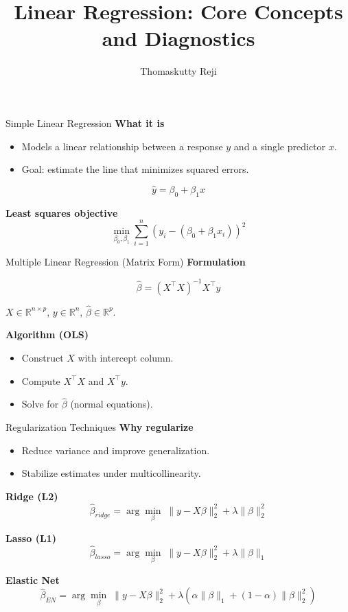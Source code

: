 \documentclass[aspectratio=169,10pt]{beamer}
\title{Linear Regression: Core Concepts and Diagnostics}
\author{Thomaskutty Reji}
\date{}
\begin{document}
\begin{frame}[t]{Simple Linear Regression}
\textbf{What it is}
\begin{itemize}
\item Models a linear relationship between a response $y$ and a single predictor $x$.
\item Goal: estimate the line that minimizes squared errors.
\end{itemize}

\begin{keyeq}
\[
\hat{y} = \beta_0 + \beta_1 x
\]
\end{keyeq}

\textbf{Least squares objective}
\[
\min_{\beta_0,\beta_1} \sum_{i=1}^{n} (y_i - (\beta_0 + \beta_1 x_i))^2
\]
\end{frame}

\begin{frame}[t]{Multiple Linear Regression (Matrix Form)}
\textbf{Formulation}
\begin{keyeq}
\[
\hat{\beta} = (X^\top X)^{-1} X^\top y
\]
\end{keyeq}
\small
$X \in \mathbb{R}^{n\times p}$, $y \in \mathbb{R}^{n}$, $\hat{\beta} \in \mathbb{R}^{p}$.

\textbf{Algorithm (OLS)}
\begin{itemize}
\item Construct $X$ with intercept column.
\item Compute $X^\top X$ and $X^\top y$.
\item Solve for $\hat{\beta}$ (normal equations).
\end{itemize}
\end{frame}

\begin{frame}[t]{Regularization Techniques}
\textbf{Why regularize}
\begin{itemize}
\item Reduce variance and improve generalization.
\item Stabilize estimates under multicollinearity.
\end{itemize}

\textbf{Ridge (L2)}
\[
\hat{\beta}_{ridge}=\arg\min_{\beta}\; \|y-X\beta\|_2^2 + \lambda\|\beta\|_2^2
\]

\textbf{Lasso (L1)}
\[
\hat{\beta}_{lasso}=\arg\min_{\beta}\; \|y-X\beta\|_2^2 + \lambda\|\beta\|_1
\]

\textbf{Elastic Net}
\[
\hat{\beta}_{EN}=\arg\min_{\beta}\; \|y-X\beta\|_2^2 + \lambda\left(\alpha\|\beta\|_1 + (1-\alpha)\|\beta\|_2^2\right)
\]
\end{frame}
\end{document}
